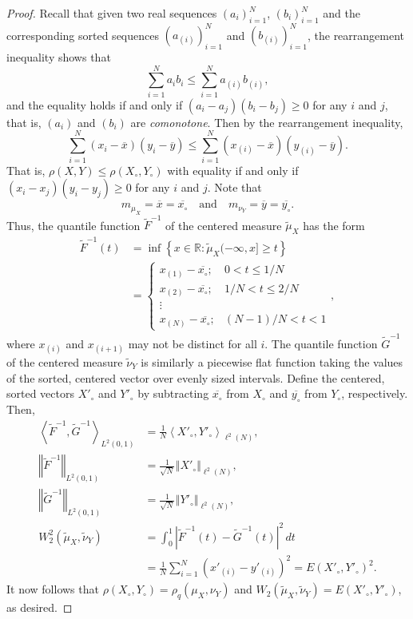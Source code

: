 \documentclass{amsart}
\numberwithin{equation}{section}
\theoremstyle{plain}
\theoremstyle{definition}
\newcommand{\ip}[2]{\left<#1,#2\right>}
\newcommand{\norm}[1]{\left\Vert#1\right\Vert}
\newcommand{\abs}[1]{\left\vert#1\right\vert}
\begin{document}
\begin{proof}
    Recall that given two real sequences $(a_i)_{i=1}^N$, $(b_i)_{i=1}^N$ and the corresponding sorted sequences $(a_{(i)})_{i=1}^N$ and $(b_{(i)})_{i=1}^N$, the rearrangement inequality shows that
$$
\sum_{i=1}^N a_i b_i \leq \sum_{i=1}^N a_{(i)} b_{(i)},
$$
and the equality holds if and only if $(a_i-a_j)(b_i-b_j) \geq 0$ for any $i$ and $j$, that is,  $(a_i)$ and $(b_i)$ are \emph{comonotone}. 
Then by the rearrangement inequality, 
$$
\sum_{i=1}^N (x_i-\overline{x})(y_i-\overline{y}) \leq
\sum_{i=1}^N (x_{(i)}-\overline{x})(y_{(i)}-\overline{y}).
$$
That is, $\rho(X,Y) \leq \rho(X_{\circ},Y_{\circ})$ with equality if and only if $(x_i-x_j)(y_i-y_j) \geq 0$ for any $i$ and $j$. 
Note that
\[
m_{\mu_X} = \overline{x} = \overline{x_{\circ}} \quad \textrm{and} \quad m_{\nu_Y} = \overline{y} = \overline{y_{\circ}}.
\]
Thus, the quantile function $\tilde{F}^{-1}$ of the centered measure $\tilde{\mu}_X$ has the form
\begin{align*}  
\tilde{F}^{-1}(t) &= \inf \left\{x\in\mathbb{R}: \tilde{\mu}_X(-\infty, x]\geq t\right\}\\
&=\left\{\begin{array}{lr}x_{(1)}-\overline{x_{\circ}}; & 0 < t \leq 1/N \\ x_{(2)}-\overline{x_{\circ}}; & 1/N < t \leq 2/N \\ \vdots & \\ x_{(N)}-\overline{x_{\circ}}; & (N-1)/N < t < 1 \end{array} \right.,
\end{align*}
where $x_{(i)}$ and $x_{(i+1)}$ may not be distinct for all $i$.
The quantile function $\tilde{G}^{-1}$ of the centered measure $\tilde{\nu}_Y$ is similarly a piecewise flat function taking the values of the sorted, centered vector over evenly sized intervals.
Define the centered, sorted vectors $X'_\circ$ and $Y'_\circ$ by subtracting $\overline{x_{\circ}}$ from $X_\circ$ and $\overline{y_{\circ}}$ from $Y_\circ$, respectively.
Then,
\begin{align*}
\ip{\tilde{F}^{-1}}{\tilde{G}^{-1}}_{L^2(0,1)} &= \frac{1}{N} \ip{X'_\circ}{Y'_\circ}_{\ell^2(N)},\\
\norm{\tilde{F}^{-1}}_{L^2(0,1)} &= \frac{1}{\sqrt{N}} \norm{X'_\circ}_{\ell^2(N)},\\
\norm{\tilde{G}^{-1}}_{L^2(0,1)} &= \frac{1}{\sqrt{N}} \norm{Y'_\circ}_{\ell^2(N)},\\
W_2^2(\tilde{\mu}_X,\tilde{\nu}_Y) &= \int_0^1 \abs{\tilde{F}^{-1}(t)-\tilde{G}^{-1}(t)}^2 \, dt \\
&= \frac{1}{N} \sum_{i=1}^N (x'_{(i)} - y'_{(i)})^2 = E(X'_\circ,Y'_\circ)^2.
\end{align*}
It now follows that $\rho(X_{\circ},Y_{\circ}) = \rho_q(\mu_X,\nu_Y)$ and $W_2(\tilde{\mu}_X,\tilde{\nu}_Y) =E(X'_\circ,Y'_\circ)$, as desired.
\end{proof}
\end{document}
